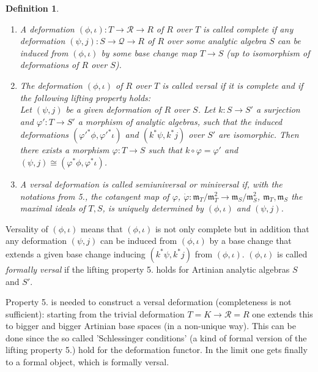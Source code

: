 \documentclass[11pt]{article}
\newtheorem{Definition}{Definition}[section]
\newcommand{\kq}{{\mathcal Q}}
\newcommand{\kr}{{\mathcal R}}
\newcommand{\fm}{\mathfrak{m}}
\begin{document}
\begin{Definition}
\begin{enumerate}
Then the morphism $\varphi^*\phi$ is flat (see e.g. \cite[Proposition 1.1.87]{GLS25}) and
there is a natural map 
$\varphi^*\iota:  \kr \hat\otimes_T S \to R$  such that 
$$(\varphi^*\phi, \varphi^*\iota) : S \to \kr \hat\otimes_T S \to R$$
is a deformation of $R$ over $S$. 
$(\varphi^*\phi, \varphi^*\iota)$ is called the 
{\em deformation induced from $(\phi, \iota)$ by $\varphi$}, and 
$\varphi$ is called the {\em base change map}.
$(\tilde \varphi,  \varphi)$ is a 
morphism of deformations from $(\varphi^*\phi, \varphi^*\iota)$ to
$(\phi, \iota)$. 
  \item    
  A deformation $(\phi,\iota): T\to \kr \to R$ of $R$ over $T$ is called {\em complete} if any deformation $(\psi,j): S\to \kq\to R$ of $R$ over some analytic algebra $S$ can be induced from $(\phi,\iota)$ by some base change map $T \to S$   (up to isomorphism of deformations of $R$ over $S$).
\item
 The deformation $(\phi,\iota)$ of $R$ over $T$ is called {\em versal} if it is complete and if the following lifting property holds:\\
Let  $(\psi,j)$ be a given deformation of $R$ over $S$. Let $k: S\to S'$ a surjection and $\varphi': T\to S'$ a morphism of analytic algebras, such that 
the induced deformations  $(\varphi'^* \phi, \varphi'^* \iota)$ and 
$(k^*\psi,k^*j)$ over $S'$ are isomorphic. Then there exists a morphism $\varphi: T \to S$ such that $k\circ \varphi = \varphi'$ 
and $(\psi,j) \cong (\varphi^* \phi, \varphi^* \iota)$.
\item 
A versal deformation is called {\em semiuniversal} or {\em miniversal} if, with the notations from 5.,  the cotangent map of
$\varphi$, $\dot\varphi: \fm_T/\fm_T^2 \to \fm_S/\fm_S^2$, 
 {$\fm_T, \fm_S$ the maximal ideals of $T, S$,}
is uniquely determined by $(\phi,\iota)$ and $(\psi,j)$. 
\end{enumerate}
\end{Definition}
Versality of $(\phi,\iota)$ means that $(\phi,\iota)$ is not only complete but in addition that any deformation $(\psi,j)$ can be induced from $(\phi,\iota)$ by a base change that  extends a given base change  inducing  $(k^*\psi,k^*j)$ from 
 $(\phi,\iota)$. $(\phi,\iota)$ is called {\it formally versal} if the lifting property 5. holds for Artinian analytic algebras $S$ and $S'$.
 
 Property 5. is needed to construct a versal deformation (completeness is not sufficient): starting from the trivial deformation $T=K \to \kr =R$
 one extends this to bigger and bigger Artinian base spaces  {(in a non-unique way)}. This can be done since the so called 'Schlessinger conditions'  (a kind of formal version of the lifting property 5.) hold for the deformation functor. In the limit one gets finally to a formal object, which is formally versal. \\
 
\end{document}
